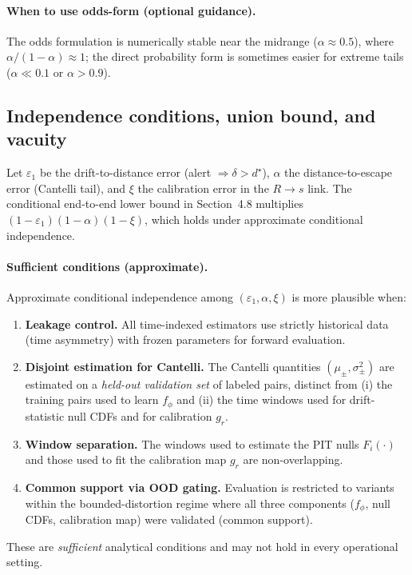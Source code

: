 \documentclass[11pt]{article}
\begin{document}
\paragraph{When to use odds-form (optional guidance).}
The odds formulation is numerically stable near the midrange ($\alpha\approx 0.5$), where $\alpha/(1-\alpha)\approx 1$; the direct probability form is sometimes easier for extreme tails ($\alpha\ll 0.1$ or $\alpha>0.9$).


\subsection{Independence conditions, union bound, and vacuity}
\label{app:independence}
Let $\varepsilon_1$ be the drift-to-distance error (alert $\Rightarrow \delta>d^\star$),
$\alpha$ the distance-to-escape error (Cantelli tail), and
$\xi$ the calibration error in the $R\!\to\!s$ link.
The conditional end-to-end lower bound in Section~4.8 multiplies $(1-\varepsilon_1)(1-\alpha)(1-\xi)$, which holds under approximate conditional independence.

\paragraph{Sufficient conditions (approximate).}
Approximate conditional independence among $(\varepsilon_1,\alpha,\xi)$ is more plausible when:
\begin{enumerate}[leftmargin=*, itemsep=2pt, topsep=2pt]
\item \textbf{Leakage control.} All time-indexed estimators use strictly historical data (time asymmetry) with frozen parameters for forward evaluation.
\item \textbf{Disjoint estimation for Cantelli.} The Cantelli quantities $(\mu_\pm,\sigma_\pm^2)$ are estimated on a \emph{held-out validation set} of labeled pairs, distinct from (i) the training pairs used to learn $f_\phi$ and (ii) the time windows used for drift-statistic null CDFs and for calibration $g_r$.
\item \textbf{Window separation.} The windows used to estimate the PIT nulls $F_i(\cdot)$ and those used to fit the calibration map $g_r$ are non-overlapping.
\item \textbf{Common support via OOD gating.} Evaluation is restricted to variants within the bounded-distortion regime where all three components ($f_\phi$, null CDFs, calibration map) were validated (common support).
\end{enumerate}
These are \emph{sufficient} analytical conditions and may not hold in every operational setting.
\end{document}
